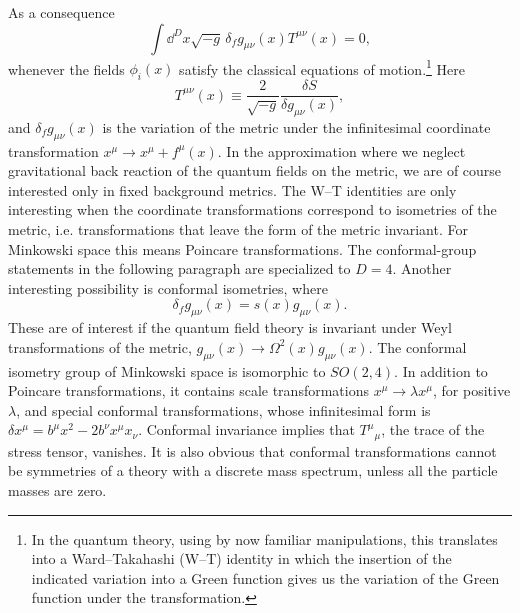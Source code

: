 As a consequence
\begin{equation*}
  \int\dd^D x\sqrt{-g}\,\delta_f g_{\mu\nu}(x)T^{\mu\nu}(x)=0,
\end{equation*}
whenever the fields $\phi_i(x)$ satisfy the classical equations of motion.\footnote[3]{In
the quantum theory, using by now familiar manipulations, this translates into
a Ward--Takahashi (W--T) identity in which the insertion of the indicated
variation into a Green function gives us the variation of the Green function
under the transformation.} Here
\begin{equation*}
  T^{\mu\nu}(x)\equiv\frac{2}{\sqrt{-g}}\frac{\delta S}{\delta g_{\mu\nu}(x)},
\end{equation*}
and $\delta_f g_{\mu\nu}(x)$ is the variation of the metric under the
infinitesimal coordinate transformation $x^\mu\to x^\mu+f^\mu(x)$. In the
approximation where we neglect gravitational back reaction of the quantum fields
on the metric, we are of course interested only in fixed background metrics.
The W--T identities are only interesting when the coordinate transformations
correspond to isometries of the metric, i.e. transformations that leave the form
of the metric invariant. For Minkowski space this means Poincare transformations.
The conformal-group statements in the following paragraph are specialized to
$D=4$.
Another interesting possibility is conformal isometries, where
\begin{equation*}
  \delta_f g_{\mu\nu}(x)=s(x)g_{\mu\nu}(x).
\end{equation*}
These are of interest if the quantum field theory is invariant under Weyl
transformations of the metric, $g_{\mu\nu}(x)\to\Omega^2(x)g_{\mu\nu}(x)$.
The conformal isometry group of Minkowski space is isomorphic to $SO(2,4)$.
In addition to Poincare transformations, it contains scale transformations
$x^\mu\to\lambda x^\mu$, for positive $\lambda$, and special conformal
transformations, whose infinitesimal form is
$\delta x^\mu=b^\mu x^2-2b^\nu x^\mu x_\nu$. Conformal invariance implies
that $T^\mu{}_{\mu}$, the trace of the stress tensor, vanishes. It is also
obvious that conformal transformations cannot be symmetries of a theory with a
discrete mass spectrum, unless all the particle masses are zero.

